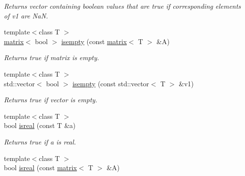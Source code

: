 \begin{DoxyCompactItemize}
\begin{DoxyCompactList}\small\item\em Returns vector containing boolean values that are true if corresponding elements of v1 are Na\-N. \end{DoxyCompactList}\item 
\hypertarget{namespacekeycpp_acc2de8926c54a2048a0d8965e7d70995}{{\footnotesize template$<$class T $>$ }\\\hyperlink{classkeycpp_1_1matrix}{matrix}$<$ bool $>$ \hyperlink{namespacekeycpp_acc2de8926c54a2048a0d8965e7d70995}{isempty} (const \hyperlink{classkeycpp_1_1matrix}{matrix}$<$ T $>$ \&A)}\label{namespacekeycpp_acc2de8926c54a2048a0d8965e7d70995}

\begin{DoxyCompactList}\small\item\em Returns true if matrix is empty. \end{DoxyCompactList}\item 
\hypertarget{namespacekeycpp_a0bffe72cf3a118ccaaa6f195c4859550}{{\footnotesize template$<$class T $>$ }\\std\-::vector$<$ bool $>$ \hyperlink{namespacekeycpp_a0bffe72cf3a118ccaaa6f195c4859550}{isempty} (const std\-::vector$<$ T $>$ \&v1)}\label{namespacekeycpp_a0bffe72cf3a118ccaaa6f195c4859550}

\begin{DoxyCompactList}\small\item\em Returns true if vector is empty. \end{DoxyCompactList}\item 
\hypertarget{namespacekeycpp_a81a8c955cdbeb60181f6bf7d6553ac53}{{\footnotesize template$<$class T $>$ }\\bool \hyperlink{namespacekeycpp_a81a8c955cdbeb60181f6bf7d6553ac53}{isreal} (const T \&a)}\label{namespacekeycpp_a81a8c955cdbeb60181f6bf7d6553ac53}

\begin{DoxyCompactList}\small\item\em Returns true if a is real. \end{DoxyCompactList}\item 
\hypertarget{namespacekeycpp_a62d7118882bac24ab403ffb5f8ee7034}{{\footnotesize template$<$class T $>$ }\\bool \hyperlink{namespacekeycpp_a62d7118882bac24ab403ffb5f8ee7034}{isreal} (const \hyperlink{classkeycpp_1_1matrix}{matrix}$<$ T $>$ \&A)}\label{namespacekeycpp_a62d7118882bac24ab403ffb5f8ee7034}


\end{DoxyCompactItemize}
